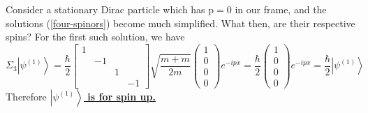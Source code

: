 Consider a stationary Dirac particle which has $\mathrm{p}=0$ in our frame, and the solutions (\ref{four-spinors}) become much simplified. What then, are their respective spins? For the first such solution, we have
$$
\Sigma_{3}\left|\psi^{(1)}\right\rangle=\frac{\hbar}{2}\left[\begin{array}{cccc}
{1} \\
{}&{-1} \\
{} & {} & {1}\\
{} &{} &{}& {-1}
\end{array}\right] \sqrt{\frac{m+m}{2 m}}\left(\begin{array}{l}
{1} \\
{0} \\
{0} \\
{0}
\end{array}\right) e^{-i p x}=\frac{\hbar}{2}\left(\begin{array}{l}
{1} \\
{0} \\
{0} \\
{0}
\end{array}\right) e^{-i p x}=\frac{\hbar}{2}\left|\psi^{(1)}\right\rangle
$$
Therefore \textbf{\underline{$\left|\psi^{(1)}\right\rangle$ is for spin up.}}

